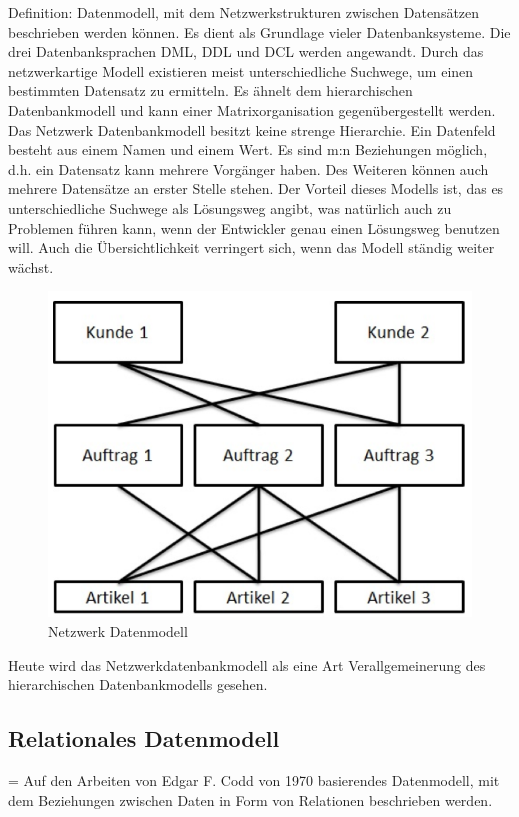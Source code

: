 Definition: Datenmodell, mit dem Netzwerkstrukturen zwischen Datensätzen beschrieben werden können.
Es dient als Grundlage vieler Datenbanksysteme. Die drei Datenbanksprachen DML, DDL und DCL werden angewandt. Durch das netzwerkartige Modell existieren meist unterschiedliche Suchwege, um einen bestimmten Datensatz zu ermitteln. Es ähnelt dem hierarchischen Datenbankmodell und kann einer Matrixorganisation gegenübergestellt werden. 
Das Netzwerk Datenbankmodell besitzt keine strenge Hierarchie. Ein Datenfeld besteht aus einem Namen und einem Wert.
Es sind m:n Beziehungen möglich, d.h. ein Datensatz kann mehrere Vorgänger haben. Des Weiteren können auch mehrere Datensätze an erster Stelle stehen. Der Vorteil dieses Modells ist, das es unterschiedliche Suchwege als Lösungsweg angibt, was natürlich auch zu Problemen führen kann, wenn der Entwickler genau einen Lösungsweg benutzen will. Auch die Übersichtlichkeit verringert sich, wenn das Modell ständig weiter wächst.

\begin{figure}[H]
    \centering
    \includegraphics[width=.75\textwidth]{Content/images/modellierung/netzwerk.png}
    \caption{Netzwerk Datenmodell}
    \label{fig:modellierung:netzwerk}
 \end{figure}

 Heute wird das Netzwerkdatenbankmodell als eine Art Verallgemeinerung des hierarchischen Datenbankmodells gesehen.

 \subsection{Relationales Datenmodell}

 = Auf den Arbeiten von Edgar F. Codd von 1970 basierendes Datenmodell, mit dem Beziehungen zwischen Daten in Form von Relationen beschrieben werden. 

